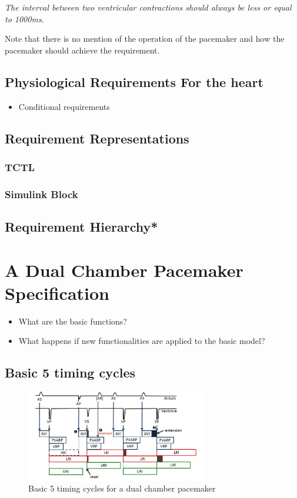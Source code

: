 \documentclass[openany]{now} %
\begin{document}
 \emph{The interval between two ventricular contractions should always be less or equal to 1000ms.} 

Note that there is no mention of the operation of the pacemaker and how the pacemaker should achieve the requirement.  
\section{Physiological Requirements For the heart}
\begin{itemize}
	\item Conditional requirements
\end{itemize}

\section{Requirement Representations}
\subsection{TCTL}
\subsection{Simulink Block}
 
\section{Requirement Hierarchy*}


\chapter{A Dual Chamber Pacemaker Specification}
\begin{itemize}
	\item What are the basic functions?
    \item What happens if new functionalities are applied to the basic model?
\end{itemize}

\section{Basic 5 timing cycles}
\begin{figure}[!b]
\center
\includegraphics[width=0.7\textwidth]{figs/PM_timers.pdf}
\caption{Basic 5 timing cycles for a dual chamber pacemaker}
\label{fig:PMtimers}
\end{figure} 
\end{document}
